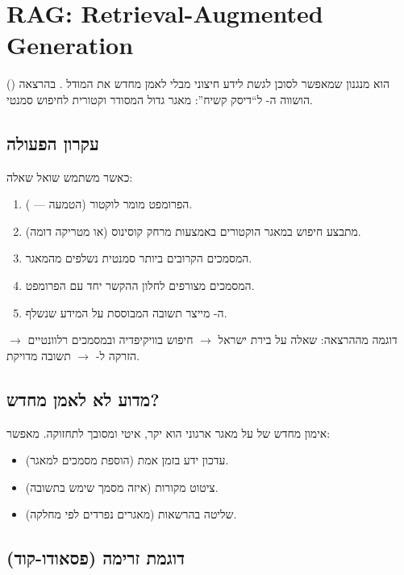 \section{RAG: Retrieval-Augmented Generation}

 () הוא מנגנון שמאפשר לסוכן
לגשת לידע חיצוני מבלי לאמן מחדש את המודל \cite{lewis2020rag}. בהרצאה
הושווה ה- ל``דיסק קשיח'': מאגר גדול המסודר וקטורית לחיפוש סמנטי.



\subsection{עקרון הפעולה}

כאשר משתמש שואל שאלה:
\begin{enumerate}[rightmargin=2em]
  \item הפרומפט מומר לוקטור (הטמעה --- ).
  \item מתבצע חיפוש במאגר הוקטורים באמצעות מרחק קוסינוס (או מטריקה דומה).
  \item המסמכים הקרובים ביותר סמנטית נשלפים מהמאגר.
  \item המסמכים מצורפים לחלון ההקשר יחד עם הפרומפט.
  \item ה- מייצר תשובה המבוססת על המידע שנשלף.
\end{enumerate}

דוגמה מההרצאה: שאלה על בירת ישראל $\rightarrow$ חיפוש בוויקיפדיה ובמסמכים
רלוונטיים $\rightarrow$ הזרקה ל- $\rightarrow$ תשובה מדויקת.

\subsection{מדוע לא לאמן מחדש?}

אימון מחדש של  על מאגר ארגוני הוא יקר, איטי ומסובך לתחזוקה.
 מאפשר:
\begin{itemize}[rightmargin=2em]
  \item עדכון ידע בזמן אמת (הוספת מסמכים למאגר).
  \item ציטוט מקורות (איזה מסמך שימש בתשובה).
  \item שליטה בהרשאות (מאגרים נפרדים לפי מחלקה).
\end{itemize}

\subsection{דוגמת זרימה (פסאודו-קוד)}

